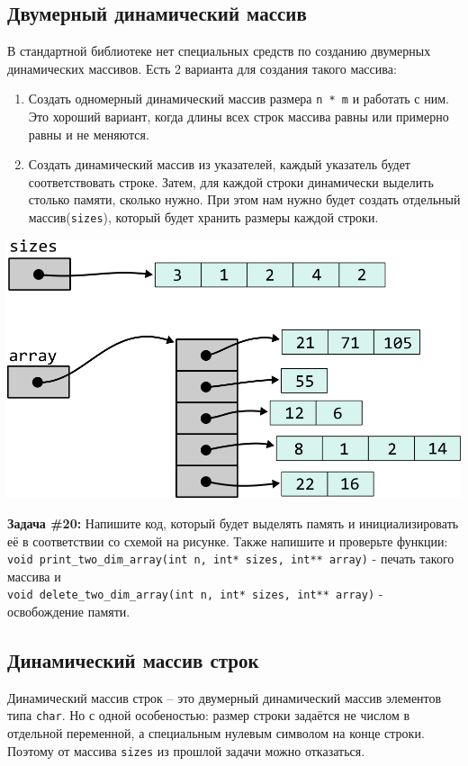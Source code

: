 \documentclass{article}
\begin{document}
\subsection*{Двумерный динамический массив}
В стандартной библиотеке нет специальных средств по созданию
двумерных динамических массивов. Есть 2 варианта для создания
такого массива:
\begin{enumerate}
\item Создать одномерный динамический массив размера \texttt{n * m} и работать с ним.
Это хороший вариант, когда длины всех строк массива равны или примерно равны и не меняются.
\item Создать динамический массив из указателей, каждый указатель будет 
соответствовать строке. Затем, для каждой строки динамически выделить столько памяти,
сколько нужно. При этом нам нужно будет создать отдельный массив(\texttt{sizes}), который будет хранить
размеры каждой строки.
\end{enumerate}
\begin{center}
\includegraphics[scale=1]{../images/pointer_schemes/two_dim_dynamic_array.png}
\end{center}
\textbf{Задача \#20:} Напишите код, который будет выделять память и инициализировать её в соответствии 
со схемой на рисунке. Также напишите и проверьте функции: \\
\texttt{void print\_two\_dim\_array(int n, int* sizes, int** array)} - печать такого массива и\\
\texttt{void delete\_two\_dim\_array(int n, int* sizes, int** array)} - освобождение памяти.

\newpage
\subsection*{Динамический массив строк}
Динамический массив строк -- это двумерный динамический массив элементов типа \texttt{char}. 
Но с одной особеностью: размер строки задаётся не числом в отдельной переменной, 
а специальным нулевым символом на конце строки. Поэтому от массива \texttt{sizes}
из прошлой задачи можно отказаться.\\
\end{document}
